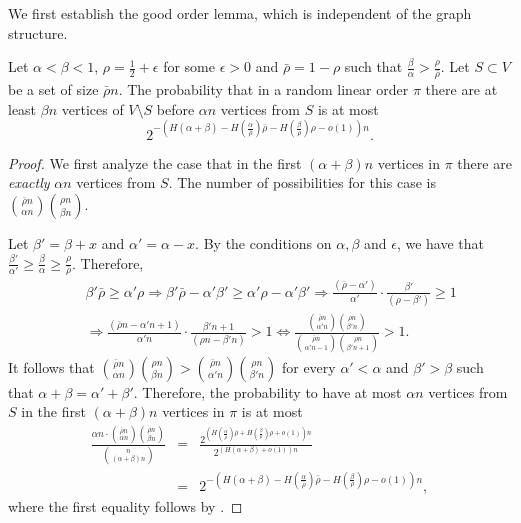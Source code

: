 \documentclass{toc}
\theoremstyle{plain}
\begin{document}
We first establish the good order lemma, which is independent of the graph structure.

\begin{lemma} 
	Let $\alpha < \beta < 1$, $\rho= \frac{1}{2}+\epsilon$ for some $\epsilon>0$ %
	and $\bar{\rho}=1-\rho$ such that $\frac{\beta}{\alpha} > \frac{\rho}{\bar{\rho}}$. Let $S\subset V$ be a set of size $\bar{\rho}n$. The probability that in a random linear order $\pi$ there are at least $\beta n$ vertices of $V\setminus S$  before $\alpha n$ vertices from $S$ is at most $$2^{-(H(\alpha+\beta)-H(\frac{\alpha}{\bar{\rho}})\bar{\rho}-H(\frac{\beta}{{\rho}}){\rho}-o(1))n}.$$\label{lem:order}
\end{lemma}
\begin{proof}
	We first analyze the case that in the first $(\alpha+\beta)n$ vertices in $\pi$ there are \emph{exactly} $\alpha n$ vertices from $S$. The number of possibilities for this case is $\binom{\bar{\rho} n}{\alpha n}\binom{\rho n}{\beta n}$.
	
	Let $\beta' = \beta+x$ and $\alpha'=\alpha-x$. By the conditions on $\alpha,\beta$ and $\epsilon$, we have that $\frac{\beta'}{\alpha'}\geq\frac{\beta}{\alpha}\geq \frac{\rho}{\bar{\rho}}$. Therefore,
	\begin{eqnarray}
		& &  \beta'\bar{\rho}\geq \alpha'\rho\Rightarrow \beta'\bar{\rho}-\alpha'\beta'\geq \alpha'\rho-\alpha'\beta'\Rightarrow \frac{(\bar{\rho}-\alpha')}{\alpha'}\cdot \frac{\beta'}{(\rho-\beta')}\geq 1 \\
		& & \Rightarrow \frac{(\bar{\rho}n-\alpha'n+1)}{\alpha'n}\cdot \frac{\beta'n+1}{(\rho n-\beta'n)} > 1 \iff\frac{\binom{\bar{\rho} n}{\alpha' n}\binom{\rho n}{\beta' n}}{\binom{\bar{\rho} n}{\alpha' n-1}\binom{\rho n}{\beta' n+1}}>1.
	\end{eqnarray}
	It follows that
	$\binom{\bar{\rho}n}{\alpha n}\binom{\rho n}{\beta n}> \binom{\bar{\rho} n}{\alpha'n}\binom{\rho n}{\beta' n}$ for every $\alpha'< \alpha$  and $\beta'>\beta$ such that $\alpha+\beta=\alpha'+\beta'$. Therefore, the probability to have at most $\alpha n$ vertices from $S$ in the first $(\alpha+\beta)n$ vertices in $\pi$ is at most
	\begin{eqnarray}
		\frac{\alpha n\cdot \binom{\bar{\rho}n}{\alpha n}\binom{\rho n}{\beta n}}{\binom{n}{(\alpha+\beta)n}}&=&\frac{2^{(H(\frac{\alpha}{\bar{\rho}})\bar{\rho}+H(\frac{\beta}{{\rho}}){\rho}+o(1))n}}{2^{(H(\alpha+\beta)+o(1))n}}\\
		& = & 2^{-(H(\alpha+\beta)-H(\frac{\alpha}{\bar{\rho}})\bar{\rho}-H(\frac{\beta}{{\rho}}){\rho}-o(1))n},
	\end{eqnarray}
where the first equality follows
by  %
.
\end{proof}
\end{document}
